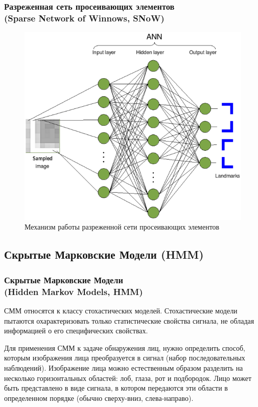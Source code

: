 \documentclass{beamer}
\begin{document}
\begin{frame}
\frametitle{Разреженная сеть просеивающих элементов\\(Sparse Network of Winnows, SNoW)}

\begin{figure}
\includegraphics[scale=0.45]{res/img08}
\caption{Механизм работы разреженной сети просеивающих элементов}
\end{figure}

\end{frame}

\subsection{Скрытые Марковские Модели (HMM)}

\begin{frame}
\frametitle{Скрытые Марковские Модели\\(Hidden Markov Models, HMM)}

СММ относятся к классу стохастических моделей. Стохастические модели пытаются охарактеризовать только статистические свойства сигнала, не обладая информацией о его специфических свойствах.
\bigskip

Для применения СММ к задаче обнаружения лиц, нужно определить способ, которым изображения лица преобразуется в сигнал (набор последовательных наблюдений). Изображение лица можно естественным образом разделить на несколько горизонтальных областей: лоб, глаза, рот и подбородок. Лицо может быть представлено в виде сигнала, в котором передаются эти области в определенном порядке (обычно сверху-вниз, слева-направо).

\end{frame}
\end{document}
